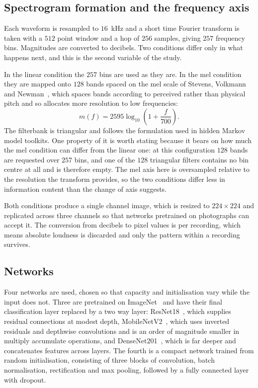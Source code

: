 \documentclass[pdflatex,sn-mathphys-num]{sn-jnl}
\begin{document}
\subsection{Spectrogram formation and the frequency axis}\label{sec:design-spectro}

Each waveform is resampled to $16$~kHz and a short time Fourier transform is taken with a
$512$ point window and a hop of $256$ samples, giving $257$ frequency bins. Magnitudes
are converted to decibels. Two conditions differ only in what happens next, and this is
the second variable of the study.

In the linear condition the $257$ bins are used as they are. In the mel condition they are
mapped onto $128$ bands spaced on the mel scale of Stevens, Volkmann and
Newman~\cite{stevens1937}, which spaces bands according to perceived rather than physical
pitch and so allocates more resolution to low frequencies:
\begin{equation}
m(f) = 2595 \log_{10}\!\left(1 + \frac{f}{700}\right).
\label{eq:mel}
\end{equation}
The filterbank is triangular and follows the formulation used in hidden Markov model
toolkits. One property of it is worth stating because it bears on how much the mel
condition can differ from the linear one: at this configuration $128$ bands are requested
over $257$ bins, and one of the $128$ triangular filters contains no bin centre at all and
is therefore empty. The mel axis here is oversampled relative to the resolution the
transform provides, so the two conditions differ less in information content than the
change of axis suggests.

Both conditions produce a single channel image, which is resized to $224 \times 224$ and
replicated across three channels so that networks pretrained on photographs can accept
it. The conversion from decibels to pixel values is per recording, which means absolute
loudness is discarded and only the pattern within a recording survives.

\subsection{Networks}\label{sec:design-nets}

Four networks are used, chosen so that capacity and initialisation vary while the input
does not. Three are pretrained on ImageNet~\cite{russakovsky2015} and have their final
classification layer replaced by a two way layer: ResNet18~\cite{he2016}, which supplies
residual connections at modest depth, MobileNetV2~\cite{sandler2018}, which uses inverted
residuals and depthwise convolutions and is an order of magnitude smaller in multiply
accumulate operations, and DenseNet201~\cite{huang2017}, which is far deeper and
concatenates features across layers. The fourth is a compact network trained from random
initialisation, consisting of three blocks of convolution, batch normalisation,
rectification and max pooling, followed by a fully connected layer with dropout.
\end{document}
